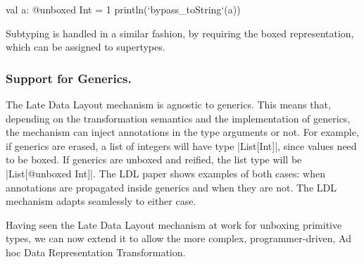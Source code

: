 \begin{lstlisting-nobreak}
val a: @unboxed Int = 1
println(`bypass_toString`(a))
\end{lstlisting-nobreak}

Subtyping is handled in a similar fashion, by requiring the boxed representation, which can be assigned to supertypes.

\subsubsection{Support for Generics.} The Late Data Layout mechanism is agnostic to generics. This means that, depending on the transformation semantics and the implementation of generics, the mechanism can inject annotations in the type arguments or not. For example, if generics are erased, a list of integers will have type |List[Int]|, since values need to be boxed. If generics are unboxed and reified, the list type will be |List[@unboxed Int]|. The LDL paper \cite{ldl} shows examples of both cases: when annotations are propagated inside generics and when they are not. The LDL mechanism adapts seamlessly to either case.

Having seen the Late Data Layout mechanism at work for unboxing primitive types, we can now extend it to allow the more complex, programmer-driven, Ad hoc Data Representation Transformation.
